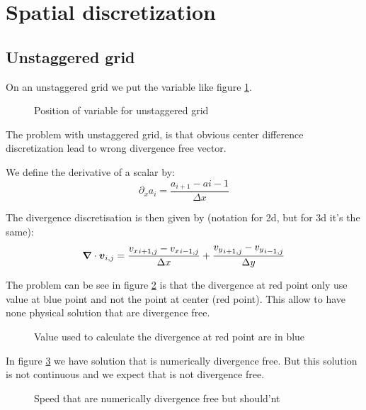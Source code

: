 \section{Spatial discretization}

\subsection{Unstaggered grid}

On an unstaggered grid we put the variable like figure \ref{fixed:unstaggered}.

\begin{figure}
\caption{Position of variable for unstaggered grid}
\label{fixed:unstaggered}
\end{figure}

The problem with unstaggered grid, is that obvious center difference discretization lead to wrong divergence free vector.

We define the derivative of a scalar by:
\begin{equation}
  \partial_x a_i=\frac{a_{i+1}-a{i-1}}{\Delta x}
\end{equation}

The divergence discretisation is then given by (notation for 2d, but for 3d it's the same):
\begin{equation}
  {\boldsymbol {\nabla}} \cdot {\boldsymbol {v}}_{i,j}=\frac{{v_{x}}_{i+1,j}-{v_{x}}_{i-1,j}}{\Delta x}+\frac{{v_{y}}_{i+1,j}-{v_{y}}_{i-1,j}}{\Delta y}
\end{equation}

The problem can be see in figure \ref{fixed:unstaggered_div} is that the divergence at red point only use value at blue point and not the point at center (red point).
This allow to have none physical solution that are divergence free.

\begin{figure}
\caption{Value used to calculate the divergence at red point are in blue}
\label{fixed:unstaggered_div}
\end{figure}

In figure \ref{fixed:unstaggered_div2} we have solution that is numerically divergence free. But this solution is not continuous and we expect that is not divergence free.

\begin{figure}
\caption{Speed that are numerically divergence free but should'nt}
\label{fixed:unstaggered_div2}
\end{figure}


